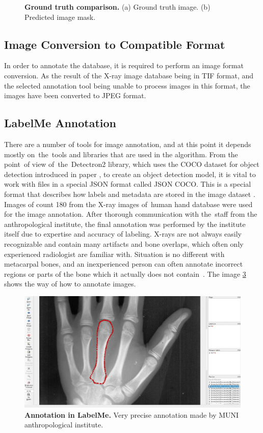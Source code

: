 \begin{figure}[!ht]
\begin{subfigure}[b]{.25\textwidth}
        \caption{}\label{GT-fake-img}
    \end{subfigure}
    \caption{\textbf{Ground truth comparison.} (a) Ground truth image. (b) Predicted image mask.}
    \label{GT}
\end{figure}

\subsection{Image Conversion to Compatible Format}
In order to annotate the database, it is required to perform an image format conversion. As the result of the X-ray image database being in TIF format, and the selected annotation tool being unable to process images in this format, the images have been converted to JPEG format.

\subsection{LabelMe Annotation}
There are a number of tools for image annotation, and at this point it depends mostly on~the~tools and libraries that are used in the algorithm. From the point~of view of~the~Detectron2 library, which uses the COCO dataset for object detection introduced in paper \cite{coco2015microsoft}, to create an object detection model, it is vital to work with files in a special JSON format called JSON COCO. This is a special format that describes how labels and metadata are stored in the image dataset \cite{COCO-JSON}. Images of count 180 from the X-ray images of~human hand database were used for the image annotation. After thorough communication with the~staff from the anthropological institute, the final annotation was performed by the institute itself due to expertise and accuracy of labeling. X-rays are not always easily recognizable and contain many artifacts and bone overlaps, which often only experienced radiologist are familiar with. Situation is no different with metacarpal bones, and an inexperienced person can often annotate incorrect regions or parts of the bone which it actually does not contain~\cite{labelme}. The  image \ref{annotation} shows the way of how to annotate images.

\begin{figure}[!ht]
    \centering
    \includegraphics[width=.7\textwidth]{obrazky-figures/annotation.pdf}
    \caption{\textbf{Annotation in LabelMe.} Very precise annotation made by MUNI anthropological institute.}
    \label{annotation}
\end{figure}

